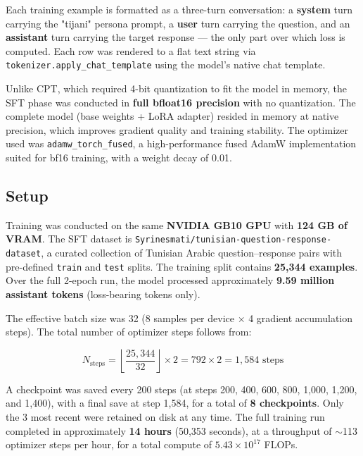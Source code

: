 \documentclass[12pt,a4paper]{report}
\begin{document}
Each training example is formatted as a three-turn conversation: a
\textbf{system} turn carrying the "tijani" persona prompt, a \textbf{user}
turn carrying the question, and an \textbf{assistant} turn carrying the target
response --- the only part over which loss is computed. Each row was rendered
to a flat text string via \texttt{tokenizer.apply\_chat\_template} using the
model's native chat template.

Unlike CPT, which required 4-bit quantization to fit the model in memory, the
SFT phase was conducted in \textbf{full bfloat16 precision} with no
quantization. The complete model (base weights + LoRA adapter) resided in
memory at native precision, which improves gradient quality and training
stability. The optimizer used was \texttt{adamw\_torch\_fused}, a
high-performance fused AdamW implementation suited for bf16 training, with a
weight decay of 0.01.



\subsection{Setup}

Training was conducted on the same \textbf{NVIDIA GB10 GPU} with \textbf{124
GB of VRAM}. The SFT dataset is
\texttt{Syrinesmati/tunisian-question-response-dataset}, a curated collection
of Tunisian Arabic question--response pairs with pre-defined \texttt{train} and
\texttt{test} splits. The training split contains \textbf{25,344 examples}.
Over the full 2-epoch run, the model processed approximately \textbf{9.59
million assistant tokens} (loss-bearing tokens only).

The effective batch size was 32 (8 samples per device $\times$ 4 gradient
accumulation steps). The total number of optimizer steps follows from:

\begin{equation}
    N_{\text{steps}} = \left\lfloor \frac{25{,}344}{32} \right\rfloor \times 2
    = 792 \times 2 = 1{,}584 \text{ steps}
\end{equation}

A checkpoint was saved every 200 steps (at steps 200, 400, 600, 800, 1{,}000,
1{,}200, and 1{,}400), with a final save at step 1{,}584, for a total of
\textbf{8 checkpoints}. Only the 3 most recent were retained on disk at any
time. The full training run completed in approximately \textbf{14 hours}
(50,353 seconds), at a throughput of $\sim$113 optimizer steps per hour, for a
total compute of $5.43 \times 10^{17}$ FLOPs.
\end{document}
